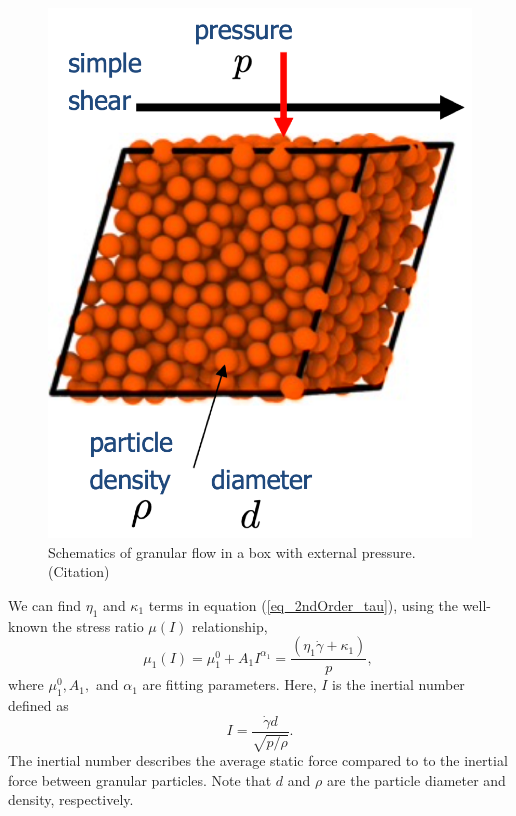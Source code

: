 \begin{figure}[ht]
  \begin{center}
    \includegraphics[scale=0.4]{figures/fig_granular_ex.png}
    \end{center}
  \caption{Schematics of granular flow in a box with external pressure.({\color{red}Citation})}
  \label{fig_Laminar_shear}
\end{figure}
We can find $\eta_1$ and $\kappa_1$ terms in equation (\ref{eq_2ndOrder_tau}), using the well-known the stress ratio $\mu(I)$ relationship,
\begin{equation}
    \mu_1(I) = \mu_1^0 + A_1{ I}^{ \alpha_1} =  \frac{(\eta_1 \dot{\gamma} + \kappa_1)}{p},\
\label{eq_muI1}
\end{equation}
where $\mu_1^0, A_1,$ and $\alpha_1$ are fitting parameters. 
Here, $I$ is the inertial number defined as 
\[
  I =  \frac{\dot{\gamma} d }{\sqrt{p/\rho}}.
\]
The inertial number describes the average static force compared to to the inertial force between granular particles.
Note that $d$ and $\rho$ are the particle diameter and density, respectively.

